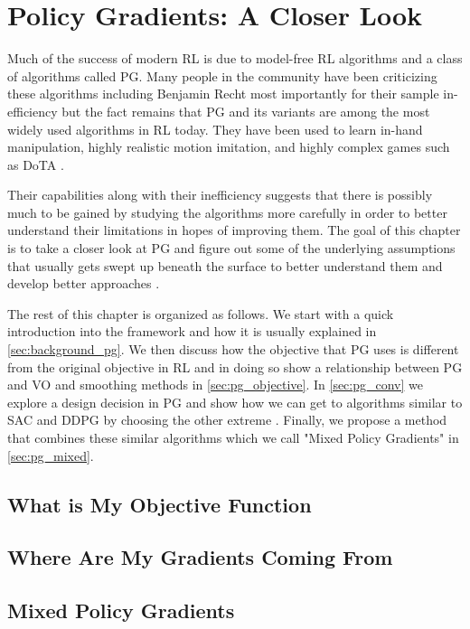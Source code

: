 \chapter{Policy Gradients: A Closer Look}
\label{ch:mixedpg}

Much of the success of modern \ac{RL} is due to model-free \ac{RL} algorithms   and a class of algorithms called \ac{PG}. Many people in the community have been criticizing these algorithms including Benjamin Recht  most importantly for their sample in-efficiency   but the fact remains that \ac{PG} and its variants are among the most widely used algorithms in \ac{RL} today. They have been used to learn in-hand manipulation, highly realistic motion imitation, and highly complex games such as DoTA  .

Their capabilities along with their inefficiency suggests that there is possibly much to be gained by studying the algorithms more carefully in order to better understand their limitations in hopes of improving them. The goal of this chapter is to take a closer look at \ac{PG} and figure out some of the underlying assumptions that usually gets swept up beneath the surface to better understand them and develop better approaches .

The rest of this chapter is organized as follows. We start with a quick introduction into the framework and how it is usually explained in \autoref{sec:background_pg}. We then discuss how the objective that \ac{PG} uses is different from the original objective in \ac{RL} and in doing so show a relationship between \ac{PG} and \ac{VO}  and smoothing methods in \autoref{sec:pg_objective}. In \autoref{sec:pg_conv} we explore a design decision in \ac{PG} and show how we can get to algorithms similar to \ac{SAC} and \ac{DDPG} by choosing the other extreme . Finally, we propose a method that combines these similar algorithms which we call "Mixed Policy Gradients" in \autoref{sec:pg_mixed}.

\section{What is My Objective Function}
\label{sec:pg_objective}

\section{Where Are My Gradients Coming From}
\label{sec:pg_conv}

\section{Mixed Policy Gradients}
\label{sec:pg_mixed}